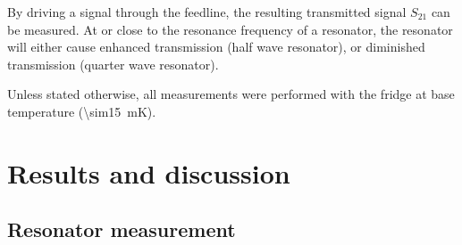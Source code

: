 \documentclass[12pt]{report}
\begin{document}
By driving a signal through the feedline, the resulting transmitted signal $S_{21}$ can be measured. At or close to the resonance frequency of a resonator, the resonator will either cause enhanced transmission (half wave resonator), or diminished transmission (quarter wave resonator).

Unless stated otherwise, all measurements were performed with the fridge at base temperature (\SI{\sim15}{\milli \kelvin}).

\section{Results and discussion}


\subsection{Resonator measurement}
\end{document}
